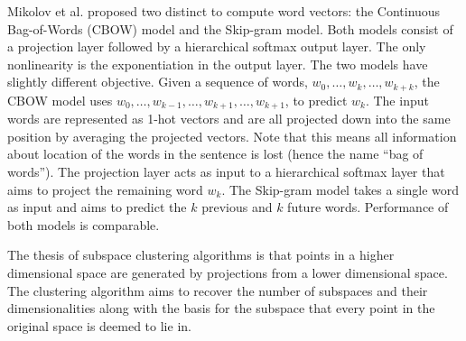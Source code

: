 Mikolov et al. proposed two distinct to compute word vectors: the Continuous Bag-of-Words (CBOW) model and the Skip-gram model. 
Both models consist of a projection layer followed by a hierarchical softmax output layer. 
The only nonlinearity is the exponentiation in the output layer. 
The two models have slightly different objective. 
Given a sequence of words, $w_0, \hdots , w_k, \hdots, w_{k+k}$, the CBOW model uses $w_0, \hdots, w_{k-1}, \hdots, w_{k+1}, \hdots, w_{k+1}$, to predict $w_k$. 
The input words are represented as 1-hot vectors and are all projected down into the same position by averaging the projected vectors. 
Note that this means all information about location of the words in the sentence is lost (hence the name “bag of words”). 
The projection layer acts as input to a hierarchical softmax layer that aims to project the remaining word $w_k$. 
The Skip-gram model takes a single word as input and aims to predict the $k$ previous and $k$ future words. 
Performance of both models is comparable.

	The thesis of subspace clustering algorithms is that points in a higher dimensional space are generated by projections from a lower dimensional space. The clustering algorithm aims to recover the number of subspaces and their dimensionalities along with the basis for the subspace that every point in the original space is deemed to lie in. 

